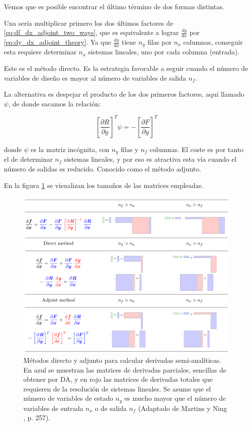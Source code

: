 Vemos que es posible encontrar el último término de dos formas distintas.

Una sería multiplicar primero los dos últimos factores de
\eqref{eq:df_dx_adjoint_two_ways}, que es equivalente a lograr $\frac{dy}{dx}$
por \eqref{eq:dy_dx_adjoint_theory}. Ya que $\frac{dy}{dx}$ tiene $n_y$ filas
por $n_x$ columnas, conseguir esta requiere determinar $n_x$ sistemas lineales,
uno por cada columna (entrada).

Este es el método directo. Es la estrategia favorable a seguir cuando el número
de variables de diseño es mayor al número de variables de salida $n_f$.

La alternativa es despejar el producto de los dos primeros factores, aquí llamado
$\psi$, de donde sacamos la relación:

\begin{equation} \label{eq:psi_adjoint_theory}
	\left[ \frac{\partial R}{\partial y} \right]^T \psi = - \left[  \frac{\partial F}{\partial y} \right]^T
\end{equation}

donde $\psi$ es la matriz incógnita, con $n_y$ filas y $n_f$ columnas. El coste
es por tanto el de determinar $n_f$ sistemas lineales, y por eso es atractiva
esta vía cuando el número de salidas es reducido. Conocido como el método
adjunto.

En la figura \ref{fig:direct_adjoint_operations} se visualizan los tamaños de
las matrices empleadas.

\begin{figure}[h]
	\centering
	\includegraphics[width=1\textwidth]{./capitulos/metodologia/images/direct_adjoint_operations.png}
	\caption{Métodos directo y adjunto para calcular derivadas semi-analíticas.
		En azul se muestran las matrices de derivadas parciales, sencillas de obtener
		por DA, y en rojo las matrices de derivadas totales que requieren de la
		resolución de sistemas lineales. Se asume que el número de variables de
		estado $n_y$ es mucho mayor que el número de variables de entrada $n_x$ o de
		salida $n_f$ (Adaptado de Martins y Ning \cite{mdobook}, p. 257).}
	\label{fig:direct_adjoint_operations}
\end{figure}


